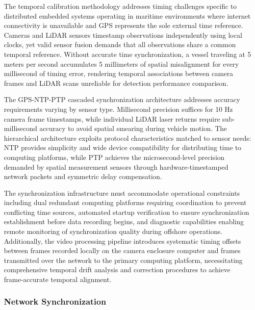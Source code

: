 \documentclass{erauthesis}
\begin{document}
The temporal calibration methodology addresses timing challenges specific to distributed embedded systems operating in maritime environments where internet connectivity is unavailable and GPS represents the sole external time reference.
Cameras and LiDAR sensors timestamp observations independently using local clocks, yet valid sensor fusion demands that all observations share a common temporal reference.
Without accurate time synchronization, a vessel traveling at 5 meters per second accumulates 5 millimeters of spatial misalignment for every millisecond of timing error, rendering temporal associations between camera frames and LiDAR scans unreliable for detection performance comparison.

The GPS-NTP-PTP cascaded synchronization architecture addresses accuracy requirements varying by sensor type.
Millisecond precision suffices for 10 Hz camera frame timestamps, while individual LiDAR laser returns require sub-millisecond accuracy to avoid spatial smearing during vehicle motion.
The hierarchical architecture exploits protocol characteristics matched to sensor needs: NTP provides simplicity and wide device compatibility for distributing time to computing platforms, while PTP achieves the microsecond-level precision demanded by spatial measurement sensors through hardware-timestamped network packets and symmetric delay compensation.

The synchronization infrastructure must accommodate operational constraints including dual redundant computing platforms requiring coordination to prevent conflicting time sources, automated startup verification to ensure synchronization establishment before data recording begins, and diagnostic capabilities enabling remote monitoring of synchronization quality during offshore operations.
Additionally, the video processing pipeline introduces systematic timing offsets between frames recorded locally on the camera enclosure computer and frames transmitted over the network to the primary computing platform, necessitating comprehensive temporal drift analysis and correction procedures to achieve frame-accurate temporal alignment.

\subsubsection{Network Synchronization} \label{time_sync_lan}
\end{document}
